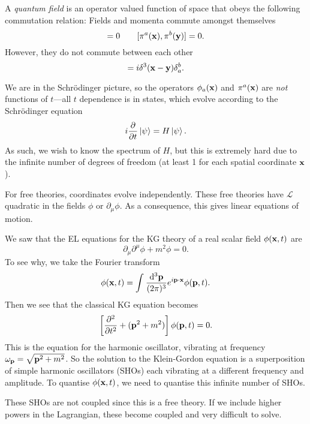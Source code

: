 \begin{definition}
  A \emph{quantum field} is an operator valued function of space that obeys the following commutation relation:
  Fields and momenta commute amongst themselves
  \begin{equation}
    [\phi_a(\vb{x}), \phi_b(\vb{y})] = 0 \qquad
    [\pi^a(\vb{x}), \pi^b(\vb{y})] = 0.
  \end{equation}
  However, they do not commute between each other
  \begin{equation}
    [\phi_a(\vb{x}), \pi^b(\vb{y})] = i \delta^3(\vb{x} - \vb{y}) \delta_a^b.
  \end{equation}
\end{definition}

We are in the Schrödinger picture, so the operators $\phi_a(\vb{x})$ and $\pi^a(\vb{x})$ are \emph{not} functions of $t$---all $t$ dependence is in states, which evolve according to the Schrödinger equation
\begin{equation}
  i \pdv{}{t} \ket{\psi} = H \ket{\psi}.
\end{equation}
As such, we wish to know the spectrum of $H$, but this is extremely hard due to the infinite number of degrees of freedom (at least 1 for each spatial coordinate $\vb{x}$ ).

For free theories, coordinates evolve independently. These free theories have $\mathcal{L}$ quadratic in the fields $\phi$ or $\partial_\mu \phi$. As a consequence, this gives linear equations of motion.

\begin{example}
  We saw that the EL equations for the KG theory of a real scalar field $\phi(\vb{x}, t)$ are
  \begin{equation}
    \partial_\mu \partial^\mu \phi + m^2 \phi = 0.
  \end{equation}
  To see why, we take the Fourier transform
  \begin{equation}
    \phi(\vb{x}, t) = \int_{}^{} \frac{\dd[3]{\vb{p}} 
  }{(2\pi)^3} e^{i \vb{p} \cdot \vb{x}} \phi(\vb{p}, t) .
  \end{equation}
  Then we see that the classical KG equation becomes
  \begin{equation}
    \left[\pdv[2]{}{t} + (\vb{p}^2 + m^2)\right] \phi(\vb{p}, t) = 0.
  \end{equation}
  This is the equation for the harmonic oscillator, vibrating at frequency $\omega_{\vb{p}} = \sqrt{\vb{p}^2 + m^2}$.
  So the solution to the Klein-Gordon equation is a superposition of simple harmonic oscillators (SHOs) each vibrating at a different frequency and amplitude. To quantise $\phi(\vb{x}, t)$, we need to quantise this infinite number of SHOs.
  \begin{leftbar}
    \begin{remark}
      These SHOs are not coupled since this is a free theory. If we include higher powers in the Lagrangian, these become coupled and very difficult to solve.
    \end{remark}
  \end{leftbar}
\end{example}

